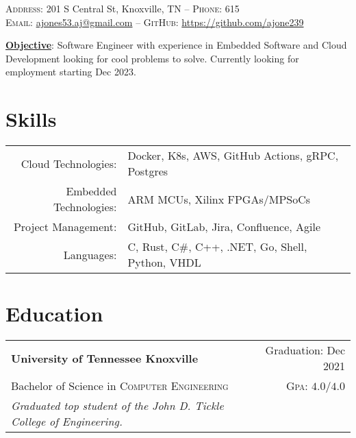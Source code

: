 \documentclass[a4paper,12pt]{article}
\begin{document}

\pagestyle{empty} %


\par{\smallskip{}
\par{\small \textsc{Address:} 201 S Central St, Knoxville, TN \---
\small \textsc{Phone:} 615\\
\textsc{Email:} \href{mailto:ajones53.aj@gmail.com}{ajones53.aj@gmail.com} \---
\textsc{GitHub:} \href{https://github.com/ajone239}{https://github.com/ajone239}
} \smallskip{}
\par{\textbf{\underline{Objective}}: Software Engineer with experience in Embedded Software and Cloud Development looking for cool problems to solve.
Currently looking for employment starting Dec 2023.
}\smallskip}{}



\section{Skills}
\begin{tabularx}{\textwidth}{rl}
   Cloud Technologies: & Docker, K8s, AWS, GitHub Actions, gRPC, Postgres \\
   Embedded Technologies: & ARM MCUs, Xilinx FPGAs/MPSoCs \\
   Project Management: & GitHub, GitLab, Jira, Confluence, Agile \\
   Languages: & C, Rust, C\#, C++, .NET, Go, Shell, Python, VHDL \\
\end{tabularx}

\section{Education}
\begin{tabularx}{\textwidth}{lXr}
   \textbf{University of Tennessee Knoxville} & & Graduation: Dec 2021\\
   Bachelor of Science in \textsc{Computer Engineering} &  & \normalsize \textsc{Gpa}: $4.0/4.0$\\
   \small{\emph{Graduated top student of the John D. Tickle College of Engineering.}}
\end{tabularx}
\end{document}
